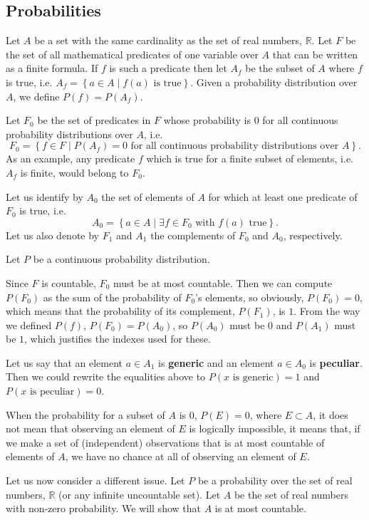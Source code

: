 \documentclass[a4paper
,draft
]{article}
\def\reale{\mathbb{R}}
\newcommand{\multime}[1]{\left\{ #1 \right\}}
\newcommand{\definitie}[1]{\textbf{#1}}
\begin{document}
\subsection{Probabilities}
\label{sec:probabilities}

Let $A$ be a set with the same cardinality as the set of real numbers, $\reale$.
Let $F$ be the set of
all mathematical predicates of one variable over $A$ that can be written as a
finite formula.
If $f$ is such a predicate then let $A_f$ be the subset of
$A$ where $f$ is true, i.e. $A_f=\multime{a\in A\mid f(a) \mbox{ is true}}$.
Given a probability distribution over $A$, we define $P(f)=P(A_f)$.

Let $F_0$ be the set of predicates in $F$ whose probability is
$0$ for all continuous probability distributions over $A$, i.e.
$$F_0=\multime{
  f\in F
  \mid P(A_f)=0
    \mbox{ for all continuous probability distributions over } A}.
$$
As an example, any predicate $f$ which is true for a finite subset of elements,
i.e. $A_f$ is finite, would belong to $F_0$.

Let us identify by $A_0$ the
set of elements of $A$ for which at least one predicate of $F_0$ is true, i.e.
$$A_0=\multime{a \in A\mid \exists f\in F_0 \mbox{ with } f(a)\mbox{ true} }.$$
Let us also denote by $F_1$ and $A_1$ the complements of $F_0$ and $A_0$,
respectively.

Let $P$ be a continuous probability distribution.

Since $F$ is countable, $F_0$ must be at most countable. Then we can compute
$P(F_0)$ as the sum of the probability of $F_0$'s elements,
so obviously, $P(F_0)=0$,
which means that the probability of its complement, $P(F_1)$, is $1$.
From the way we defined $P(f)$, $P(F_0) = P(A_0)$, so $P(A_0)$ must be $0$
and $P(A_1)$ must be $1$, which justifies the indexes used for
these.

Let us say that an element $a\in A_1$ is \definitie{generic}
and an element $a\in A_0$ is \definitie{peculiar}. Then we could rewrite
the equalities above to $P(x\mbox{ is generic}) = 1$ and
$P(x\mbox{ is peculiar}) = 0$.

When the probability for a subset of $A$ is $0$, $P(E)=0$, where $E\subset A$,
it does not mean that observing an element of $E$ is logically impossible,
it means that,
if we make a set of (independent) observations that is at most countable
of elements of $A$, we have no chance at all of observing an element of $E$.

Let us now consider a different issue.
Let $P$ be a probability over the set of real numbers, $\reale$ (or
any infinite uncountable set).
Let $A$ be the set of real numbers with non-zero probability.
We will show that $A$ is at most countable.
\end{document}
